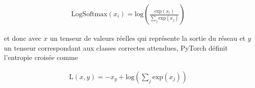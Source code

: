 {\Large%
	\setlength{\abovedisplayskip}{-0.5cm}
	\begin{gather*}
		\text{LogSoftmax}(x_i) = \text{log}(\frac{\text{exp}(x_i)}{\sum_{j}{\text{exp}(x_j)}})
	\end{gather*}
}%

et donc avec $x$ un tenseur de valeurs réelles qui représente la sortie du réseau et $y$ un tenseur correspondant aux classes correctes attendues, PyTorch \parencite{noauthor_crossentropyloss_nodate} définit l'entropie croisée comme

{\Large%
	\setlength{\abovedisplayskip}{-0.5cm}
	\begin{gather*}
		\text{L}(x, y) = -x_y + \text{log}(\sum_{j}{\text{exp}(x_j)})
	\end{gather*}
}%

